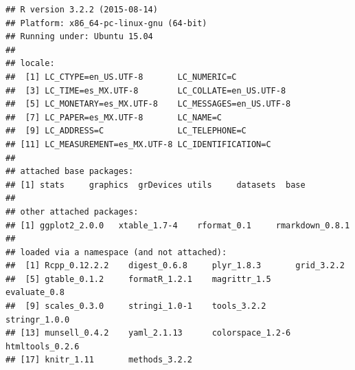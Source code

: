 \documentclass[]{article}
\begin{document}
\begin{verbatim}
## R version 3.2.2 (2015-08-14)
## Platform: x86_64-pc-linux-gnu (64-bit)
## Running under: Ubuntu 15.04
## 
## locale:
##  [1] LC_CTYPE=en_US.UTF-8       LC_NUMERIC=C              
##  [3] LC_TIME=es_MX.UTF-8        LC_COLLATE=en_US.UTF-8    
##  [5] LC_MONETARY=es_MX.UTF-8    LC_MESSAGES=en_US.UTF-8   
##  [7] LC_PAPER=es_MX.UTF-8       LC_NAME=C                 
##  [9] LC_ADDRESS=C               LC_TELEPHONE=C            
## [11] LC_MEASUREMENT=es_MX.UTF-8 LC_IDENTIFICATION=C       
## 
## attached base packages:
## [1] stats     graphics  grDevices utils     datasets  base     
## 
## other attached packages:
## [1] ggplot2_2.0.0   xtable_1.7-4    rformat_0.1     rmarkdown_0.8.1
## 
## loaded via a namespace (and not attached):
##  [1] Rcpp_0.12.2.2    digest_0.6.8     plyr_1.8.3       grid_3.2.2      
##  [5] gtable_0.1.2     formatR_1.2.1    magrittr_1.5     evaluate_0.8    
##  [9] scales_0.3.0     stringi_1.0-1    tools_3.2.2      stringr_1.0.0   
## [13] munsell_0.4.2    yaml_2.1.13      colorspace_1.2-6 htmltools_0.2.6 
## [17] knitr_1.11       methods_3.2.2
\end{verbatim}
\end{document}
